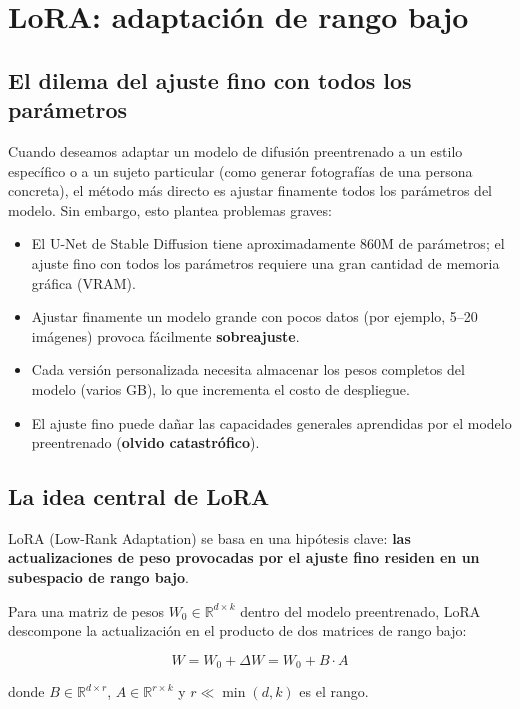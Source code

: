 \section{LoRA: adaptación de rango bajo}

\subsection{El dilema del ajuste fino con todos los parámetros}

Cuando deseamos adaptar un modelo de difusión preentrenado a un estilo específico o a un sujeto particular (como generar fotografías de una persona concreta), el método más directo es ajustar finamente todos los parámetros del modelo. Sin embargo, esto plantea problemas graves:

\begin{itemize}
    \item El U-Net de Stable Diffusion tiene aproximadamente 860M de parámetros; el ajuste fino con todos los parámetros requiere una gran cantidad de memoria gráfica (VRAM).
    \item Ajustar finamente un modelo grande con pocos datos (por ejemplo, 5--20 imágenes) provoca fácilmente \textbf{sobreajuste}.
    \item Cada versión personalizada necesita almacenar los pesos completos del modelo (varios GB), lo que incrementa el costo de despliegue.
    \item El ajuste fino puede dañar las capacidades generales aprendidas por el modelo preentrenado (\textbf{olvido catastrófico}).
\end{itemize}

\subsection{La idea central de LoRA}

LoRA (Low-Rank Adaptation) se basa en una hipótesis clave: \textbf{las actualizaciones de peso provocadas por el ajuste fino residen en un subespacio de rango bajo}.

Para una matriz de pesos $W_0 \in \mathbb{R}^{d \times k}$ dentro del modelo preentrenado, LoRA descompone la actualización en el producto de dos matrices de rango bajo:

$$
W = W_0 + \Delta W = W_0 + B \cdot A
$$

donde $B \in \mathbb{R}^{d \times r}$, $A \in \mathbb{R}^{r \times k}$ y $r \ll \min(d, k)$ es el rango.

